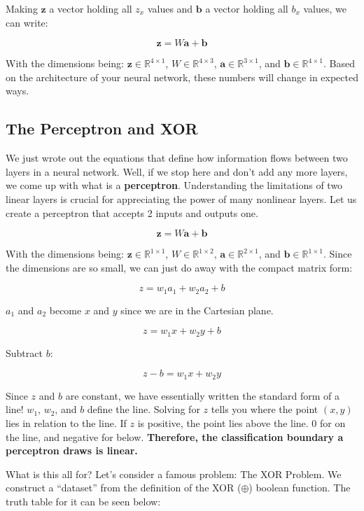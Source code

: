     Making $\textbf{z}$ a vector holding all $z_x$ values and $\textbf{b}$ a vector holding all $b_x$ values, we can write:

    $$\textbf{z} = W\textbf{a} + \textbf{b}$$

    With the dimensions being: $\textbf{z} \in \mathbb{R}^{4 \times 1}$, $W \in \mathbb{R}^{4 \times 3}$, $\textbf{a} \in \mathbb{R}^{3 \times 1}$, and $\textbf{b} \in \mathbb{R}^{4 \times 1}$. Based on the architecture of your neural network, these numbers will change in expected ways.

\subsection{The Perceptron and XOR}
    \large We just wrote out the equations that define how information flows between two layers in a neural network. Well, if we stop here and don't add any more layers, we come up with what is a \textbf{perceptron}. Understanding the limitations of two linear layers is crucial for appreciating the power of many nonlinear layers. Let us create a perceptron that accepts 2 inputs and outputs one.

    $$\textbf{z} = W\textbf{a} + \textbf{b}$$

    With the dimensions being: $\textbf{z} \in \mathbb{R}^{1 \times 1}$, $W \in \mathbb{R}^{1 \times 2}$, $\textbf{a} \in \mathbb{R}^{2 \times 1}$, and $\textbf{b} \in \mathbb{R}^{1 \times 1}$. Since the dimensions are so small, we can just do away with the compact matrix form:

    $$z = w_1a_1 + w_2a_2 + b$$

    $a_1$ and $a_2$ become $x$ and $y$ since we are in the Cartesian plane.

    $$z = w_1x + w_2y + b$$

    Subtract $b$:

    $$z - b = w_1x + w_2y$$

    Since $z$ and $b$ are constant, we have essentially written the standard form of a line! $w_1$, $w_2$, and $b$ define the line. Solving for $z$ tells you where the point $(x, y)$ lies in relation to the line. If $z$ is positive, the point lies above the line. 0 for on the line, and negative for below. \textbf{Therefore, the classification boundary a perceptron draws is linear.}

    What is this all for? Let's consider a famous problem: The XOR Problem. We construct a ``dataset'' from the definition of the XOR ($\oplus$) boolean function. The truth table for it can be seen below:

